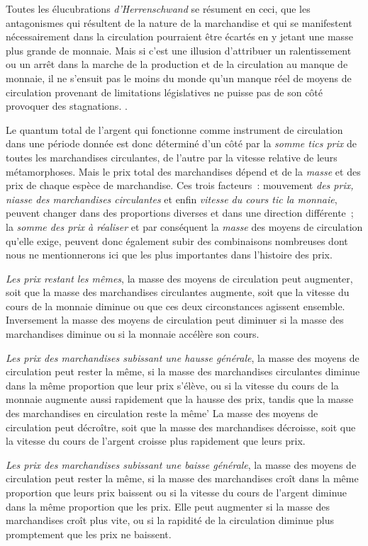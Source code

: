 \documentclass[french,twoside]{book} %
\begin{document}
{ Toutes les élucubrations \emph{d’Herrenschwand} se résument en ceci, que les antagonismes qui résultent de la nature de la marchandise et qui se manifestent nécessairement dans la circulation pourraient être écartés en y jetant une masse plus grande de monnaie. Mais si c’est une illusion d’attribuer un ralentissement ou un arrêt dans la marche de la production et de la circulation au manque de monnaie, il ne s’ensuit pas le moins du monde qu’un manque réel de moyens de circulation provenant de limitations législatives ne puisse pas de son côté provoquer des stagnations.
}.\par
Le quantum total de l’argent qui fonctionne comme instrument de circulation dans une période donnée est donc déterminé d’un côté par la \emph{somme tics prix} de toutes les marchandises circulantes, de l’autre par la vitesse relative de leurs métamorphoses. Mais le prix total des marchandises dépend et de la \emph{masse} et des prix de chaque espèce de marchandise. Ces trois facteurs : mouvement \emph{des prix, niasse des marchandises circulantes} et enfin \emph{vitesse du cours tic la monnaie}, peuvent changer dans des proportions diverses et dans une direction différente ; la \emph{somme des prix à réaliser} et par conséquent la \emph{masse} des moyens de circulation qu’elle exige, peuvent donc également subir des combinaisons nombreuses dont nous ne mentionnerons ici que les plus importantes dans l’histoire des prix.\par
\emph{Les prix restant les mêmes}, la masse des moyens de circulation peut augmenter, soit que la masse des marchandises circulantes augmente, soit que la vitesse du cours de la monnaie diminue ou que ces deux circonstances agissent ensemble. Inversement la masse des moyens de circulation peut diminuer si la masse des marchandises diminue ou si la monnaie accélère son cours.\par
\emph{Les prix des marchandises subissant une hausse générale}, la masse des moyens de circulation peut rester la même, si la masse des marchandises circulantes diminue dans la même proportion que leur prix s’élève, ou si la vitesse du cours de la monnaie augmente aussi rapidement que la hausse des prix, tandis que la masse des marchandises en circulation reste la même' La masse des moyens de circulation peut décroître, soit que la masse des marchandises décroisse, soit que la vitesse du cours de l’argent croisse plus rapidement que leurs prix.\par
\emph{Les prix des marchandises subissant une baisse générale}, la masse des moyens de circulation peut rester la même, si la masse des marchandises croît dans la même proportion que leurs prix baissent ou si la vitesse du cours de l’argent diminue dans la même proportion que les prix. Elle peut augmenter si la masse des marchandises croît plus vite, ou si la rapidité de la circulation diminue plus promptement que les prix ne baissent.\par
\end{document}
